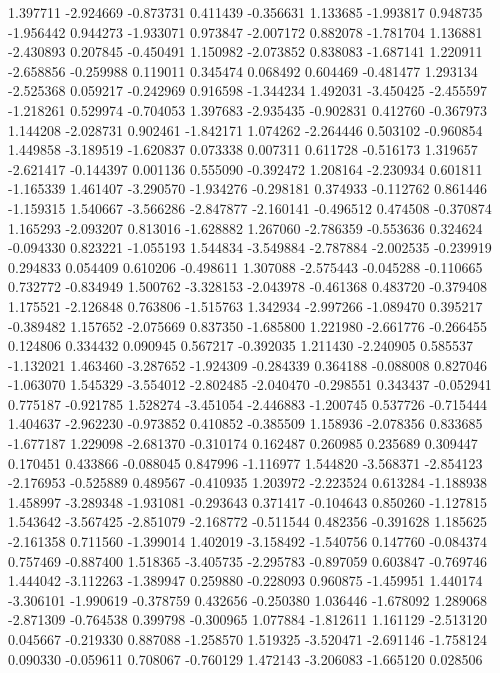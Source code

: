 1.397711
-2.924669
-0.873731
0.411439
-0.356631
1.133685
-1.993817
0.948735
-1.956442
0.944273
-1.933071
0.973847
-2.007172
0.882078
-1.781704
1.136881
-2.430893
0.207845
-0.450491
1.150982
-2.073852
0.838083
-1.687141
1.220911
-2.658856
-0.259988
0.119011
0.345474
0.068492
0.604469
-0.481477
1.293134
-2.525368
0.059217
-0.242969
0.916598
-1.344234
1.492031
-3.450425
-2.455597
-1.218261
0.529974
-0.704053
1.397683
-2.935435
-0.902831
0.412760
-0.367973
1.144208
-2.028731
0.902461
-1.842171
1.074262
-2.264446
0.503102
-0.960854
1.449858
-3.189519
-1.620837
0.073338
0.007311
0.611728
-0.516173
1.319657
-2.621417
-0.144397
0.001136
0.555090
-0.392472
1.208164
-2.230934
0.601811
-1.165339
1.461407
-3.290570
-1.934276
-0.298181
0.374933
-0.112762
0.861446
-1.159315
1.540667
-3.566286
-2.847877
-2.160141
-0.496512
0.474508
-0.370874
1.165293
-2.093207
0.813016
-1.628882
1.267060
-2.786359
-0.553636
0.324624
-0.094330
0.823221
-1.055193
1.544834
-3.549884
-2.787884
-2.002535
-0.239919
0.294833
0.054409
0.610206
-0.498611
1.307088
-2.575443
-0.045288
-0.110665
0.732772
-0.834949
1.500762
-3.328153
-2.043978
-0.461368
0.483720
-0.379408
1.175521
-2.126848
0.763806
-1.515763
1.342934
-2.997266
-1.089470
0.395217
-0.389482
1.157652
-2.075669
0.837350
-1.685800
1.221980
-2.661776
-0.266455
0.124806
0.334432
0.090945
0.567217
-0.392035
1.211430
-2.240905
0.585537
-1.132021
1.463460
-3.287652
-1.924309
-0.284339
0.364188
-0.088008
0.827046
-1.063070
1.545329
-3.554012
-2.802485
-2.040470
-0.298551
0.343437
-0.052941
0.775187
-0.921785
1.528274
-3.451054
-2.446883
-1.200745
0.537726
-0.715444
1.404637
-2.962230
-0.973852
0.410852
-0.385509
1.158936
-2.078356
0.833685
-1.677187
1.229098
-2.681370
-0.310174
0.162487
0.260985
0.235689
0.309447
0.170451
0.433866
-0.088045
0.847996
-1.116977
1.544820
-3.568371
-2.854123
-2.176953
-0.525889
0.489567
-0.410935
1.203972
-2.223524
0.613284
-1.188938
1.458997
-3.289348
-1.931081
-0.293643
0.371417
-0.104643
0.850260
-1.127815
1.543642
-3.567425
-2.851079
-2.168772
-0.511544
0.482356
-0.391628
1.185625
-2.161358
0.711560
-1.399014
1.402019
-3.158492
-1.540756
0.147760
-0.084374
0.757469
-0.887400
1.518365
-3.405735
-2.295783
-0.897059
0.603847
-0.769746
1.444042
-3.112263
-1.389947
0.259880
-0.228093
0.960875
-1.459951
1.440174
-3.306101
-1.990619
-0.378759
0.432656
-0.250380
1.036446
-1.678092
1.289068
-2.871309
-0.764538
0.399798
-0.300965
1.077884
-1.812611
1.161129
-2.513120
0.045667
-0.219330
0.887088
-1.258570
1.519325
-3.520471
-2.691146
-1.758124
0.090330
-0.059611
0.708067
-0.760129
1.472143
-3.206083
-1.665120
0.028506
